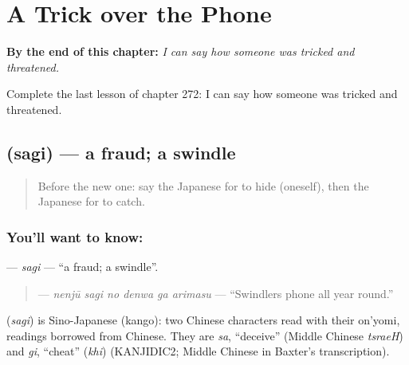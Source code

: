 
\chapter{A Trick over the Phone}
\label{ch:ja-a-trick-over-the-phone}

\begin{chapteropening}
\textbf{By the end of this chapter:} \emph{I can say how someone was tricked and threatened.}

Complete the last lesson of chapter 272: I can say how someone was tricked and threatened.
\end{chapteropening}

\section[\texorpdfstring{\ja{さぎ} (sagi)}{さぎ (sagi)}]{ (sagi) — a fraud; a swindle}

\label{lesson:JA-C272-sagi}



\begin{quote}
Before the new one: say the Japanese for to hide (oneself), then the Japanese for to catch.
\end{quote}

\subsection*{You'll want to know: }
\textbf{} — \emph{sagi} — \textquotedblleft{}a fraud; a swindle\textquotedblright{}.

\begin{quote}
\textbf{   } — \emph{nenjū sagi no denwa ga arimasu} — \textquotedblleft{}Swindlers phone all year round.\textquotedblright{}
\end{quote}

\begin{cousinweb}
\textbf{} (\emph{sagi}) is Sino-Japanese (kango): two Chinese characters read with their on'yomi, readings borrowed from Chinese. They are \emph{sa}, \textquotedblleft{}deceive\textquotedblright{} (Middle Chinese \emph{tsraeH}) and \emph{gi}, \textquotedblleft{}cheat\textquotedblright{} (\emph{khi}) (KANJIDIC2; Middle Chinese in Baxter's transcription).
\end{cousinweb}

